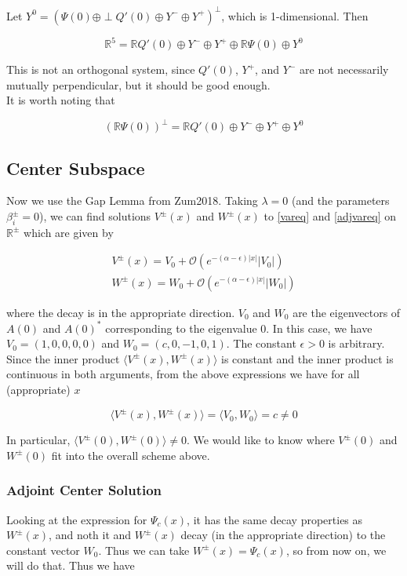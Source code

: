 \documentclass[12pt]{article}
\def\R{{\mathbb R}}
\begin{document}
Let $Y^0 = (\Psi(0) \oplus \perp Q'(0) \oplus Y^- \oplus Y^+)^\perp$, which is 1-dimensional. Then 

\[
\R^5 = \R Q'(0) \oplus Y^- \oplus Y^+ \oplus \R \Psi(0) \oplus Y^0
\]

This is not an orthogonal system, since $Q'(0)$, $Y^+$, and $Y^-$ are not necessarily mutually perpendicular, but it should be good enough.\\

It is worth noting that

\[
(\R \Psi(0))^\perp = \R Q'(0) \oplus Y^- \oplus Y^+ \oplus Y^0
\]

\subsection*{Center Subspace}

Now we use the Gap Lemma from Zum2018. Taking $\lambda = 0$ (and the parameters $\beta_i^\pm = 0$), we can find solutions $V^\pm(x)$ and $W^\pm(x)$ to \eqref{vareq} and \eqref{adjvareq} on $\R^\pm$ which are given by

\begin{align*}
V^\pm(x) = V_0 + \mathcal{O}(e^{-(\alpha - \epsilon)|x|}|V_0|) \\
W^\pm(x) = W_0 + \mathcal{O}(e^{-(\alpha - \epsilon)|x|}|W_0|)
\end{align*}

where the decay is in the appropriate direction. $V_0$ and $W_0$ are the eigenvectors of $A(0)$ and $A(0)^*$ corresponding to the eigenvalue 0. In this case, we have $V_0 = (1, 0, 0, 0, 0)$ and $W_0 = (c, 0, -1, 0, 1)$. The constant $\epsilon > 0$ is arbitrary. Since the inner product $\langle V^\pm(x), W^\pm(x) \rangle$ is constant and the inner product is continuous in both arguments, from the above expressions we have for all (appropriate) $x$

\[
\langle V^\pm(x), W^\pm(x) \rangle = \langle V_0, W_0 \rangle = c \neq 0
\]

In particular, $\langle V^\pm(0), W^\pm(0) \rangle \neq 0$. We would like to know where $V^\pm(0)$ and $W^\pm(0)$ fit into the overall scheme above. \\

\subsubsection*{Adjoint Center Solution}

Looking at the expression for $\Psi_c(x)$, it has the same decay properties as $W^\pm(x)$, and noth it and $W^\pm(x)$ decay (in the appropriate direction) to the constant vector $W_0$. Thus we can take $W^\pm(x) = \Psi_c(x)$, so from now on, we will do that. Thus we have
\end{document}
